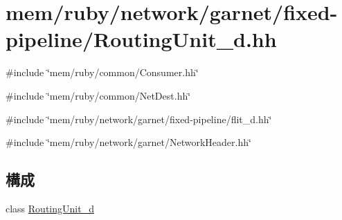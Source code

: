 \hypertarget{RoutingUnit__d_8hh}{
\section{mem/ruby/network/garnet/fixed-\/pipeline/RoutingUnit\_\-d.hh}
\label{RoutingUnit__d_8hh}
}
{\ttfamily \#include \char`\"{}mem/ruby/common/Consumer.hh\char`\"{}}\par
{\ttfamily \#include \char`\"{}mem/ruby/common/NetDest.hh\char`\"{}}\par
{\ttfamily \#include \char`\"{}mem/ruby/network/garnet/fixed-\/pipeline/flit\_\-d.hh\char`\"{}}\par
{\ttfamily \#include \char`\"{}mem/ruby/network/garnet/NetworkHeader.hh\char`\"{}}\par
\subsection*{構成}
\begin{DoxyCompactItemize}
\item 
class \hyperlink{classRoutingUnit__d}{RoutingUnit\_\-d}
\end{DoxyCompactItemize}
